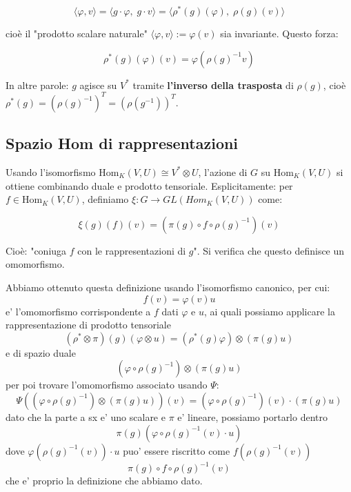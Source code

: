 $$\langle \varphi, v \rangle = \langle g \cdot \varphi,\; g \cdot v \rangle = \langle \rho^*(g)(\varphi),\; \rho(g)(v) \rangle$$

cioè il "prodotto scalare naturale" $\langle \varphi, v \rangle := \varphi(v)$ sia invariante. Questo forza:

$$\rho^*(g)(\varphi)(v) = \varphi(\rho(g)^{-1} v)$$

In altre parole: $g$ agisce su $V^*$ tramite \textbf{l'inverso della trasposta} di $\rho(g)$, cioè $\rho^*(g) = (\rho(g)^{-1})^T = (\rho(g^{-1}))^T$.


\subsection{Spazio Hom di rappresentazioni}
Usando l'isomorfismo $\mathrm{Hom}_K(V,U) \cong V^* \otimes U$, l'azione di $G$ su $\mathrm{Hom}_K(V,U)$ si ottiene combinando duale e prodotto tensoriale. Esplicitamente: per $f \in \mathrm{Hom}_K(V,U)$, definiamo $ \xi: G \to GL(Hom_K(V,U)) $ come:

$$\xi (g)(f)(v) = (\pi(g) \circ f \circ \rho(g)^{-1})(v)$$

Cioè: "coniuga $f$ con le rappresentazioni di $g$". Si verifica che questo definisce un omomorfismo.

Abbiamo ottenuto questa definizione usando l'isomorfismo canonico, per cui:
\[
  f(v) = \varphi(v)u
\]
e' l'omomorfismo corrispondente a $ f $ dati $ \varphi $ e $ u $, ai quali possiamo applicare la rappresentazione di prodotto tensoriale
\[
  (\rho^* \otimes \pi)(g)(\varphi \otimes u) = (\rho^*(g)\varphi) \otimes (\pi(g)u)
\]
e di spazio duale
\[
  (\varphi \circ \rho(g)^{-1}) \otimes (\pi(g)u)
\]
per poi trovare l'omomorfismo associato usando $ \Psi $:
\[
  \Psi((\varphi \circ \rho(g)^{-1}) \otimes (\pi(g)u))(v) = (\varphi \circ \rho(g)^{-1})(v) \cdot (\pi(g)u)
\]
dato che la parte a sx e' uno scalare e $ \pi $ e' lineare, possiamo portarlo dentro
\[
  \pi(g)(\varphi \circ \rho(g)^{-1}(v)\cdot u)
\]
dove $ \varphi(\rho(g)^{-1}(v)) \cdot u $ puo' essere riscritto come $ f(\rho(g)^{-1}(v)) $
\[
  \pi(g) \circ f \circ \rho(g)^{-1}(v)
\]
che e' proprio la definizione che abbiamo dato.

